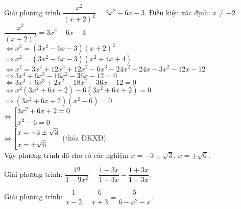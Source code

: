 \begin{bt}%
	Giải phương trình $\dfrac{x^2}{(x+2)^2} = 3x^2 - 6x - 3$.
	\loigiai
	{
		Điều kiện xác định: $x \neq -2$.\\
		\hspace*{0.6cm} $\dfrac{x^2}{(x+2)^2} = 3x^2 - 6x - 3$\\
		$\Leftrightarrow x^2 = (3x^2 - 6x - 3)(x + 2)^2$\\
		$\Leftrightarrow x^2 = (3x^2 - 6x - 3)(x^2 + 4x + 4)$\\
		$\Leftrightarrow x^2 = 3x^4 + 12x^3 + 12x^2 - 6x^3 - 24x^2 - 24x - 3x^2 - 12x - 12$\\
		$\Leftrightarrow 3x^4 + 6x^3 - 16x^2 - 36x - 12 = 0$\\
		$\Leftrightarrow 3x^4 + 6x^3 + 2x^2 - 18x^2 - 36x - 12 = 0$\\
		$\Leftrightarrow x^2(3x^2 + 6x + 2) - 6(3x^2 + 6x + 2) = 0$\\
		$\Leftrightarrow (3x^2 + 6x + 2)(x^2 - 6) = 0$\\
		$\Leftrightarrow \left[\begin{aligned}& 3x^2 + 6x + 2 = 0 \\& x^2 - 6 = 0\end{aligned}\right.$\\
		$\Leftrightarrow \left[\begin{aligned}& x = -3 \pm \sqrt{3} \\& x = \pm \sqrt{6}\end{aligned}\right.$ (thỏa ĐKXĐ).\\
		Vậy phương trình đã cho có các nghiệm $x = -3 \pm \sqrt{3}$, $x = \pm \sqrt{6}$.
	}
\end{bt}
\begin{bt}%
	Giải phương trình: $\dfrac{12}{1-9x^2}=\dfrac{1-3x}{1+3x}-\dfrac{1+3x}{1-3x}$.
\end{bt}

\begin{bt}%
	Giải phương trình: $\dfrac{1}{x-2}-\dfrac{6}{x+3}=\dfrac{5}{6-x^2-x}$.
\end{bt}

